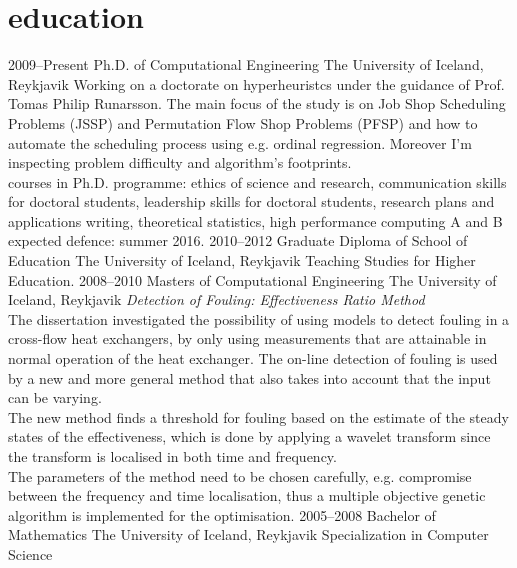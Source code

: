 \documentclass[]{cv} %
\begin{document}
\section{education}
\begin{entrylist}
\entry
{2009--Present}
{Ph.D. {\normalfont of Computational Engineering}}
{The University of Iceland, Reykjavik}
{Working on a doctorate on hyperheuristcs under the guidance of Prof. Tomas Philip Runarsson. The main focus of the study is on Job Shop Scheduling Problems (JSSP) and Permutation Flow Shop Problems (PFSP) and how to automate the scheduling process using e.g. ordinal regression. Moreover I'm inspecting problem difficulty and algorithm's footprints. \\
{\boldfont courses in Ph.D. programme:} 
ethics of science and research, communication skills for doctoral students, leadership skills for doctoral students, research plans and applications writing, theoretical statistics, high performance computing A and B  \\
{\boldfont expected defence:} summer 2016.}
\entry
{2010--2012}
{Graduate Diploma {\normalfont of School of Education}}
{The University of Iceland, Reykjavik}
{Teaching Studies for Higher Education.}
\entry
{2008--2010}
{Masters {\normalfont of Computational Engineering}}
{The University of Iceland, Reykjavik}
{\emph{Detection of Fouling: Effectiveness Ratio Method} \\ 
The dissertation investigated the possibility of using models to detect fouling in a cross-flow heat exchangers, by only using measurements that are attainable in normal operation of the heat exchanger.  The on-line detection of fouling is used by a new and more general method that also takes into account that the input can be varying. \\
The new method finds a threshold for fouling based on the estimate of the steady states of the effectiveness, which is done by applying a wavelet transform since the transform is localised in both time and frequency. \\
The parameters of the method need to be chosen carefully, e.g. compromise between the frequency and time localisation, thus a multiple objective genetic algorithm is implemented for the optimisation. }
\entry
{2005--2008}
{Bachelor {\normalfont of Mathematics}}
{The University of Iceland, Reykjavik}
{Specialization in Computer Science}
\end{entrylist}
\end{document}
